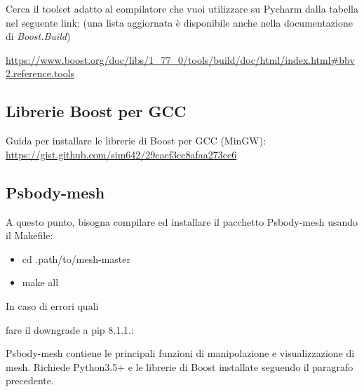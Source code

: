 \medskip

Cerca il toolset adatto al compilatore che vuoi utilizzare su Pycharm dalla tabella nel seguente link: (una lista aggiornata è disponibile anche nella documentazione di \textit{Boost.Build})

\medskip

\url{https://www.boost.org/doc/libs/1_77_0/tools/build/doc/html/index.html#bbv2.reference.tools}

\medskip

\subsection{Librerie Boost per GCC}

\medskip

Guida per installare le librerie di Boost per GCC (MinGW): \\
\url{https://gist.github.com/sim642/29caef3cc8afaa273ce6}

\medskip

\subsection{Psbody-mesh}

\medskip

A questo punto, bisogna compilare ed installare il pacchetto Psbody-mesh usando il Makefile:

\medskip

\begin{itemize}
\item cd .path/to/mesh-master
\item make all
\end{itemize}

\medskip

In caso di errori quali


\medskip


\medskip 

fare il downgrade a pip 8.1.1.:

\medskip





\medskip

Psbody-mesh contiene le principali funzioni di manipolazione e visualizzazione di mesh. Richiede Python3.5$+$ e le librerie di Boost installate seguendo il paragrafo precedente.

